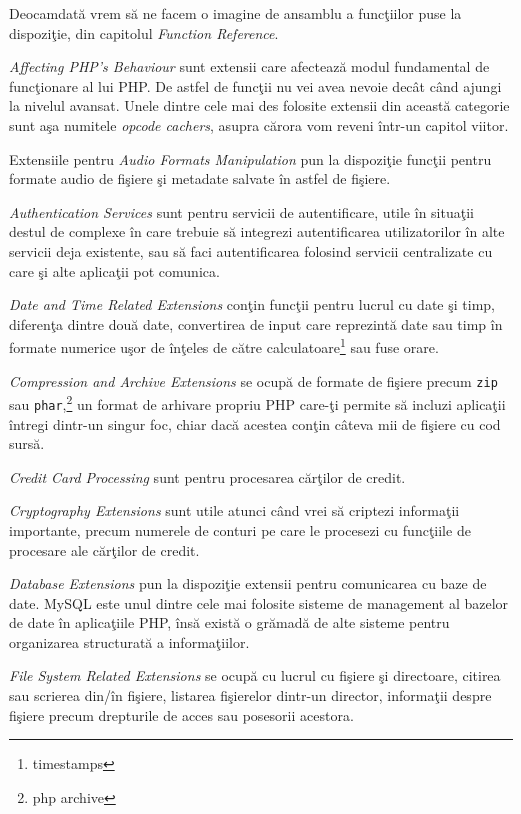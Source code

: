 Deocamdată vrem să ne facem o imagine de ansamblu a funcţiilor
puse la dispoziţie, din capitolul \textit{Function Reference}.

\textit{Affecting PHP's Behaviour} sunt extensii care afectează
modul fundamental de funcţionare al lui PHP. De astfel de funcţii
nu vei avea nevoie decât când ajungi la nivelul avansat. Unele
dintre cele mai des folosite extensii din această categorie sunt
aşa numitele \textit{opcode cachers},
asupra cărora vom reveni într-un capitol viitor.

Extensiile pentru \textit{Audio Formats Manipulation} pun
la dispoziţie funcţii pentru formate audio de fişiere şi metadate
salvate în astfel de fişiere.

\textit{Authentication Services} sunt pentru servicii de autentificare,
utile în situaţii destul de complexe în care trebuie să integrezi
autentificarea utilizatorilor în alte servicii deja existente, sau să
faci autentificarea folosind servicii centralizate cu care şi alte aplicaţii pot
comunica.

\textit{Date and Time Related Extensions} conţin funcţii pentru
lucrul cu date şi timp, diferenţa dintre două date, convertirea
de input care reprezintă date sau timp în formate numerice uşor
de înţeles de către calculatoare\footnote{timestamps} sau fuse orare.

\textit{Compression and Archive Extensions} se ocupă de formate
de fişiere precum \texttt{zip} sau \texttt{phar},\footnote{php archive}
un format de arhivare propriu PHP care-ţi permite să incluzi aplicaţii
întregi dintr-un singur foc, chiar dacă acestea conţin câteva mii
de fişiere cu cod sursă.

\textit{Credit Card Processing} sunt pentru procesarea cărţilor de credit.

\textit{Cryptography Extensions} sunt utile atunci când vrei să
criptezi informaţii importante, precum numerele de conturi pe care le
procesezi cu funcţiile de procesare ale cărţilor de credit.

\textit{Database Extensions} pun la dispoziţie extensii pentru
comunicarea cu baze de date. MySQL este unul dintre cele mai folosite
sisteme de management al bazelor de date în aplicaţiile
PHP, însă există o grămadă de alte sisteme pentru organizarea
structurată a informaţiilor.

\textit{File System Related Extensions} se ocupă cu lucrul cu
fişiere şi directoare, citirea sau scrierea din/în fişiere,
listarea fişierelor dintr-un director, informaţii despre fişiere
precum drepturile de acces sau posesorii acestora.

